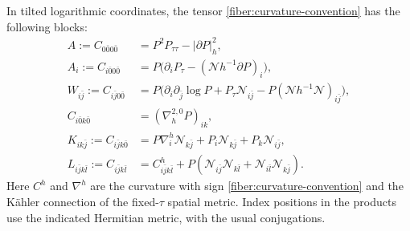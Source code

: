 \begin{lemma}\label{fiber:blocks}
In tilted logarithmic coordinates, the tensor
\eqref{fiber:curvature-convention} has the following blocks:
\begin{align}
 A:=C_{0\bar0 0\bar0}
   &=P^2P_{\tau\tau}-|\partial P|_h^2,
 \label{fiber:blockA}\\
 A_i:=C_{i\bar0 0\bar0}
   &=P\bigl(\partial_iP_\tau-
       (\mathcal N h^{-1}\partial P)_i\bigr),
 \label{fiber:blockAi}\\
 W_{i\bar j}:=C_{i\bar j0\bar0}
   &=P\bigl(\partial_i\partial_{\bar j}\log P
       +P_\tau\mathcal N_{i\bar j}
       -P(\mathcal N h^{-1}\mathcal N)_{i\bar j}\bigr),
 \label{fiber:blockW}\\
 C_{i\bar0 k\bar0}&=(\nabla_h^{2,0}P)_{ik},
 \label{fiber:blockspin}\\
 K_{ik\bar j}:=C_{i\bar j k\bar0}
   &=P\nabla_i^h\mathcal N_{k\bar j}
      +P_i\mathcal N_{k\bar j}+P_k\mathcal N_{i\bar j},
 \label{fiber:blockK}\\
 L_{i\bar j k\bar l}:=C_{i\bar j k\bar l}
   &=C^h_{i\bar j k\bar l}
      +P(\mathcal N_{i\bar j}\mathcal N_{k\bar l}
          +\mathcal N_{i\bar l}\mathcal N_{k\bar j}).
 \label{fiber:blockL}
\end{align}
Here \(C^h\) and \(\nabla^h\) are the curvature with sign
\eqref{fiber:curvature-convention} and the K\"ahler connection of the
fixed-\(\tau\) spatial metric.  Index positions in the products use the
indicated Hermitian metric, with the usual conjugations.
\end{lemma}

